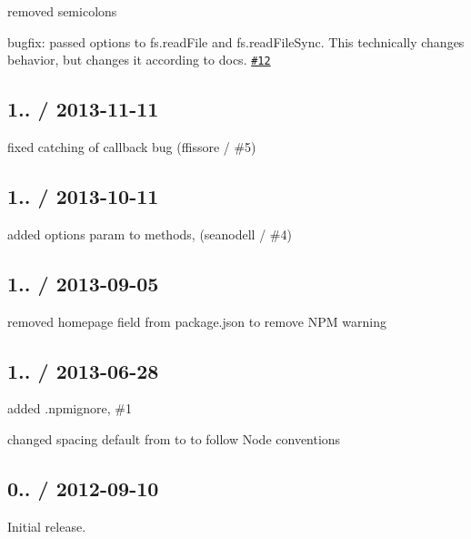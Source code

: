 \begin{DoxyItemize}
\item removed semicolons
\item bugfix\+: passed {\ttfamily options} to {\ttfamily fs.\+read\+File} and {\ttfamily fs.\+read\+File\+Sync}. This technically changes behavior, but changes it according to docs. \href{https://github.com/jprichardson/node-jsonfile/issues/12}{\tt \#12}
\end{DoxyItemize}

\subsection*{1.. / 2013-\/11-\/11 }


\begin{DoxyItemize}
\item fixed catching of callback bug (ffissore / \#5)
\end{DoxyItemize}

\subsection*{1.. / 2013-\/10-\/11 }


\begin{DoxyItemize}
\item added {\ttfamily options} param to methods, (seanodell / \#4)
\end{DoxyItemize}

\subsection*{1.. / 2013-\/09-\/05 }


\begin{DoxyItemize}
\item removed {\ttfamily homepage} field from package.\+json to remove N\+PM warning
\end{DoxyItemize}

\subsection*{1.. / 2013-\/06-\/28 }


\begin{DoxyItemize}
\item added {\ttfamily .npmignore}, \#1
\item changed spacing default from {} to {} to follow Node conventions
\end{DoxyItemize}

\subsection*{0.. / 2012-\/09-\/10 }


\begin{DoxyItemize}
\item Initial release. 
\end{DoxyItemize}